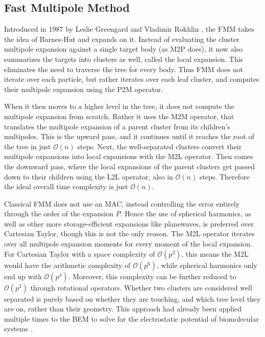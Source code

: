\subsection{Fast Multipole Method}
\label{sec:optimization-techniques-nbody-fmm}

Introduced in 1987 by Leslie Greengard and Vladimir Rokhlin \cite{greengard1987fmm}, the FMM takes the idea of Barnes-Hut and expands on it.
Instead of evaluating the cluster multipole expansion against a single target body (as M2P does), it now also summarizes the targets into clusters as well, called the local expansion.
This eliminates the need to traverse the tree for every body.
Thus FMM does not iterate over each particle, but rather iterates over each leaf cluster, and computes their multipole expansion using the P2M operator.

When it then moves to a higher level in the tree, it does not compute the multipole expansion from scratch.
Rather it uses the M2M operator, that translates the multipole expansion of a parent cluster from its children's multipoles.
This is the upward pass, and it continues until it reaches the root of the tree in just \(\mathcal{O}(n)\) steps.
Next, the well-separated clusters convert their multipole expansions into local expansions with the M2L operator.
Then comes the downward pass, where the local expansions of the parent clusters get passed down to their children using the L2L operator, also in \(\mathcal{O}(n)\) steps.
Therefore the ideal overall time complexity is just \(\mathcal{O}(n)\).

Classical FMM does not use an MAC, instead controlling the error entirely through the order of the expansion $P$.
Hence the use of spherical harmonics, as well as other more storage-efficient expansions like planewaves, is preferred over Cartesian Taylor, though this is not the only reason.
The M2L operator iterates over all multipole expansion moments for every moment of the local expansion.
For Cartesian Taylor with a space complexity of \(\mathcal{O}(p^3)\), this means the M2L would have the arithmetic complexity of \(\mathcal{O}(p^6)\), while spherical harmonics only end up with \(\mathcal{O}(p^4)\).
Moreover, this complexity can be further reduced to \(\mathcal{O}(p^3)\) through rotational operators.
Whether two clusters are considered well separated is purely based on whether they are touching, and which tree level they are on, rather than their geometry.
This approach had already been applied multiple times to the BEM to solve for the electrostatic potential of biomolecular systems \cite{bharadwaj1995fmbem, cheng1999fastadaptive, wilson2022tabipb2, yokota2011fmbem}.

